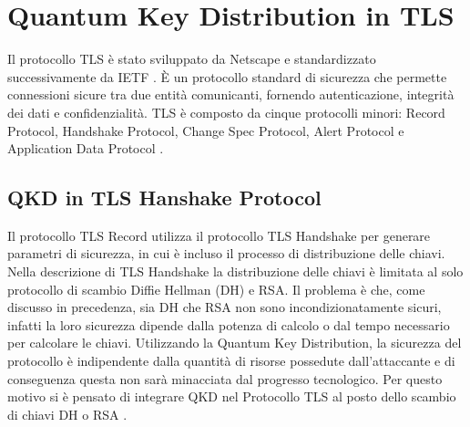 \chapter{Quantum Key Distribution in TLS}
Il protocollo TLS è stato sviluppato da Netscape \cite{freier_secure_2011} e standardizzato successivamente da IETF \cite{rescorla_transport_2008}. È un protocollo standard di sicurezza che permette connessioni sicure tra due entità comunicanti, fornendo autenticazione, integrità dei dati e confidenzialità. TLS è composto da cinque protocolli minori: Record Protocol, Handshake Protocol, Change Spec Protocol, Alert Protocol e Application Data Protocol \cite{elboukhari_improving_nodate}.

\section{QKD in TLS Hanshake Protocol}
Il protocollo TLS Record utilizza il protocollo TLS Handshake per generare parametri di sicurezza, in cui è incluso il processo di distribuzione delle chiavi. Nella descrizione di TLS Handshake \cite{rescorla_transport_2008} la distribuzione delle chiavi è limitata al solo protocollo di scambio Diffie Hellman (DH) e RSA. Il problema è che, come discusso in precedenza, sia DH che RSA non sono incondizionatamente sicuri, infatti la loro sicurezza dipende dalla potenza di calcolo o dal tempo necessario per calcolare le chiavi. Utilizzando la Quantum Key Distribution, la sicurezza del protocollo è indipendente dalla quantità di risorse possedute dall'attaccante e di conseguenza questa non sarà minacciata dal progresso tecnologico. Per questo motivo si è pensato di integrare QKD nel Protocollo TLS al posto dello scambio di chiavi DH o RSA \cite{elboukhari_improving_nodate}.

